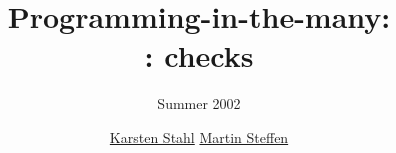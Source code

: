 \documentclass[ps,landscape,accumulate,economy,slideColor,nototal]{prosper}
\title{Programming-in-the-many: 
  \\ \Slime: checks\\ }
\subtitle{ \small Summer 2002}
\author{%
  \href{http://www.informatik.uni-kiel.de/~kst}{Karsten Stahl}
  \quad
  \href{http://www.informatik.uni-kiel.de/~ms}{Martin Steffen}
  }
\begin{document}
\maketitle{}





%

%
%




\end{document}
